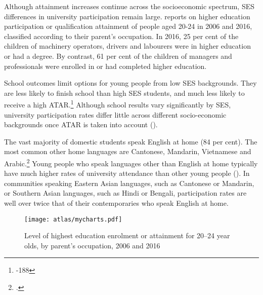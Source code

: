 \documentclass{grattan}
\begin{document}
Although attainment increases continue across the socioeconomic spectrum, SES differences in university participation remain large.  reports on higher education participation or qualification attainment of people aged 20-24 in 2006 and 2016, classified according to their parent's occupation. In 2016, 25 per cent of the children of machinery operators, drivers and labourers were in higher education or had a degree. By contrast, 61 per cent of the children of managers and professionals were enrolled in or had completed higher education.

School outcomes limit options for young people from low SES backgrounds. They are less likely to finish school than high SES students, and much less likely to receive a high ATAR.\footnote{\textcite[][186]{Norton2016equityandmarkets}-188} Although school results vary significantly by SES, university participation rates differ little across different socio-economic backgrounds once ATAR is taken into account ().

The vast majority of domestic students speak English at home (84 per cent). The most common other home languages are Cantonese, Mandarin, Vietnamese and Arabic.\footcite[][table~9.2]{DepartmentofEducationandTraining2017totalresourcingfo} Young people who speak languages other than English at home typically have much higher rates of university attendance than other young people (). In communities speaking Eastern Asian languages, such as Cantonese or Mandarin, or Southern Asian languages, such as Hindi or Bengali, participation rates are well over twice that of their contemporaries who speak English at home.

    \begin{figure} %
    \caption{Level of highest education enrolment or attainment for 20--24 year olds, by parent's occupation, 2006 and 2016}\label{fig:level-of-highest-education-enrolment-or-attainment-for-2024-year-olds-by-parents-occupation-2006-and-2016}
    \units{}
    \texttt{[image: atlas/mycharts.pdf]}
    \end{figure}
\end{document}
